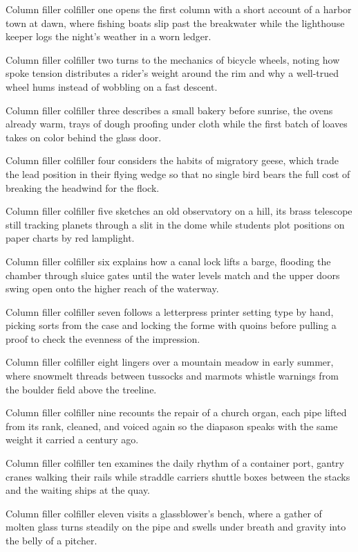 \documentclass[twocolumn]{article}
\begin{document}
Column filler colfiller one opens the first column with a short account of a
harbor town at dawn, where fishing boats slip past the breakwater while the
lighthouse keeper logs the night's weather in a worn ledger.

Column filler colfiller two turns to the mechanics of bicycle wheels, noting
how spoke tension distributes a rider's weight around the rim and why a
well-trued wheel hums instead of wobbling on a fast descent.

Column filler colfiller three describes a small bakery before sunrise, the
ovens already warm, trays of dough proofing under cloth while the first batch
of loaves takes on color behind the glass door.

Column filler colfiller four considers the habits of migratory geese, which
trade the lead position in their flying wedge so that no single bird bears the
full cost of breaking the headwind for the flock.

Column filler colfiller five sketches an old observatory on a hill, its brass
telescope still tracking planets through a slit in the dome while students
plot positions on paper charts by red lamplight.

Column filler colfiller six explains how a canal lock lifts a barge, flooding
the chamber through sluice gates until the water levels match and the upper
doors swing open onto the higher reach of the waterway.

Column filler colfiller seven follows a letterpress printer setting type by
hand, picking sorts from the case and locking the forme with quoins before
pulling a proof to check the evenness of the impression.

Column filler colfiller eight lingers over a mountain meadow in early summer,
where snowmelt threads between tussocks and marmots whistle warnings from the
boulder field above the treeline.

Column filler colfiller nine recounts the repair of a church organ, each pipe
lifted from its rank, cleaned, and voiced again so the diapason speaks with
the same weight it carried a century ago.

Column filler colfiller ten examines the daily rhythm of a container port,
gantry cranes walking their rails while straddle carriers shuttle boxes
between the stacks and the waiting ships at the quay.

Column filler colfiller eleven visits a glassblower's bench, where a gather of
molten glass turns steadily on the pipe and swells under breath and gravity
into the belly of a pitcher.
\end{document}
